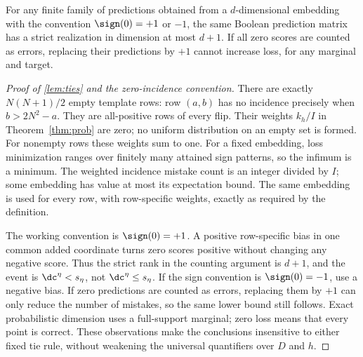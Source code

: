 \begin{lemma}\label{lem:ties}
For any finite family of predictions obtained from a $d$-dimensional embedding with the convention $\sign(0)=+1$ or $-1$, the same Boolean prediction matrix has a strict realization in dimension at most $d+1$. If all zero scores are counted as errors, replacing their predictions by $+1$ cannot increase loss, for any marginal and target.
\end{lemma}

\begin{proof}[Proof of \cref{lem:ties} and the zero-incidence convention]
There are exactly $N(N+1)/2$ empty template rows: row $(a,b)$ has no incidence precisely when $b>2N^2-a$. They are all-positive rows of every flip. Their weights $k_h/I$ in Theorem~\ref{thm:prob} are zero; no uniform distribution on an empty set is formed. For nonempty rows these weights sum to one. For a fixed embedding, loss minimization ranges over finitely many attained sign patterns, so the infimum is a minimum. The weighted incidence mistake count is an integer divided by $I$; some embedding has value at most its expectation bound. The same embedding is used for every row, with row-specific weights, exactly as required by the definition.

The working convention is $\sign(0)=+1$. A positive row-specific bias in one common added coordinate turns zero scores positive without changing any negative score. Thus the strict rank in the counting argument is $d+1$, and the event is $\dc^\eta<s_\eta$, not $\dc^\eta\le s_\eta$. If the sign convention is $\sign(0)=-1$, use a negative bias. If zero predictions are counted as errors, replacing them by $+1$ can only reduce the number of mistakes, so the same lower bound still follows. Exact probabilistic dimension uses a full-support marginal; zero loss means that every point is correct. These observations make the conclusions insensitive to either fixed tie rule, without weakening the universal quantifiers over $D$ and $h$.
\end{proof}
